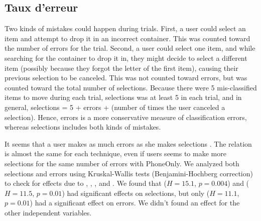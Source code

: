 
\subsection{Taux d'erreur}
\label{subsec:experiment_results_errors}

Two kinds of mistakes could happen during trials. First, a user could select an item and attempt to drop it in an incorrect container. This was counted toward the number of errors for the trial. Second, a user could select one item, and while searching for the container to drop it in, they might decide to select a different item (possibly because they forgot the letter of the first item), causing their previous selection to be canceled. This was not counted toward errors, but was counted toward the total number of selections. Because there were 5 mis-classified items to move during each trial, selections was at least 5 in each trial, and in general, selections = 5 + errors + (number of times the user canceled a selection). Hence, errors is a more conservative measure of classification errors, whereas selections includes both kinds of mistakes.

It seems that a user makes as much errors as she makes selections . The relation is almost the same for each technique, even if users seems to make more selections for the same number of errors with PhoneOnly. We analyzed both selections and errors using Kruskal-Wallis tests (Benjamini-Hochberg correction) to check for effects due to , , , and . We found that  ($H = 15.1$, $p = 0.004$) and  ($H = 11.5$, $p = 0.01$) had significant effects on selections, but only  ($H = 11.1$, $p  = 0.01$) had a significant effect on errors. We didn't found an effect for the other independent variables.




